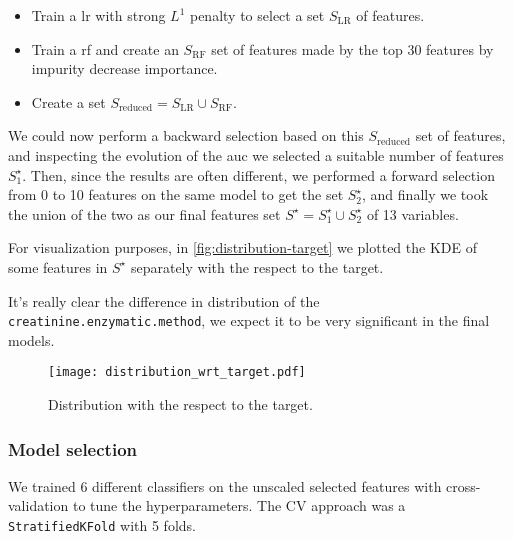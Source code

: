 \begin{itemize}
    \item Train a \gls{lr} with strong $L^1$ penalty to select a set $S_\text{LR}$ of features.
    \item Train a \gls{rf} and create an $S_\text{RF}$ set of features made by the top 30 features by impurity decrease importance.
    \item Create a set $S_\text{reduced} = S_\text{LR} \cup S_\text{RF}$.
\end{itemize}

We could now perform a backward selection based on this $S_\text{reduced}$ set of features, and inspecting the evolution of the \gls{auc} we selected a suitable number of features $S^\star_1$. Then, since the results are often different, we performed a forward selection from 0 to 10 features on the same model to get the set $S^\star_2$, and finally we took the union of the two as our final features set $S^\star = S^\star_1 \cup S^\star_2$ of 13 variables.

For visualization purposes, in \autoref{fig:distribution-target} we plotted the KDE of some features in $S^\star$ separately with the respect to the target.

It's really clear the difference in distribution of the \texttt{creatinine.enzymatic.method}, we expect it to be very significant in the final models.

\begin{figure}
    \centering
    \texttt{[image: distribution\_wrt\_target.pdf]}
    \caption{Distribution with the respect to the target.}
    \label{fig:distribution-target}
\end{figure}

\subsubsection{Model selection}

We trained 6 different classifiers on the unscaled selected features with cross-validation to tune the hyperparameters. The CV approach was a \texttt{StratifiedKFold} with 5 folds.

